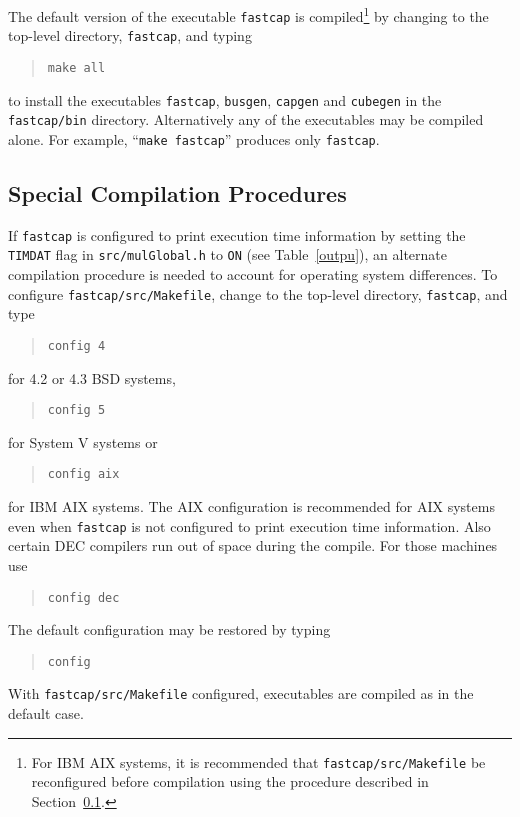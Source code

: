 The default version of the executable {\tt fastcap} is 
compiled\footnote{For IBM AIX systems, it is recommended that
{\tt fastcap/src/Makefile} be reconfigured before compilation
using the procedure described in
Section~\ref{specom}.}
by changing to the top-level directory, {\tt fastcap}, and typing 
\begin{quote}
\begin{verbatim}
make all
\end{verbatim}
\end{quote}
to install the executables {\tt fastcap}, 
{\tt busgen}, {\tt capgen} and
{\tt cubegen} in the {\tt fastcap/bin} directory. Alternatively any of the
executables may be compiled alone. For example, ``{\tt make fastcap}''
produces only {\tt fastcap}.

\subsection{Special Compilation Procedures}
\label{specom}

If {\tt fastcap} is configured to print execution time information
by setting the {\tt TIMDAT} flag in {\tt src/mulGlobal.h} to {\tt ON}
(see Table~\ref{outpu}), an alternate compilation procedure is
needed to account for operating system differences.
To configure {\tt fastcap/src/Makefile}, change to the top-level
directory, {\tt fastcap}, and  type
\begin{quote}
\begin{verbatim}
config 4
\end{verbatim}
\end{quote}
for 4.2 or 4.3 BSD systems,
\begin{quote}
\begin{verbatim}
config 5
\end{verbatim}
\end{quote}
for System V systems or
\begin{quote}
\begin{verbatim}
config aix
\end{verbatim}
\end{quote}
for IBM AIX systems. The AIX configuration is recommended for AIX systems
even when {\tt fastcap} is not configured to print execution time
information. Also certain DEC compilers run out of space during the
compile.  For those machines use
\begin{quote}
\begin{verbatim}
config dec
\end{verbatim}
\end{quote}
The default configuration may be restored by typing
\begin{quote}
\begin{verbatim}
config
\end{verbatim}
\end{quote}
With {\tt fastcap/src/Makefile} configured, executables are
compiled as in the default case.

